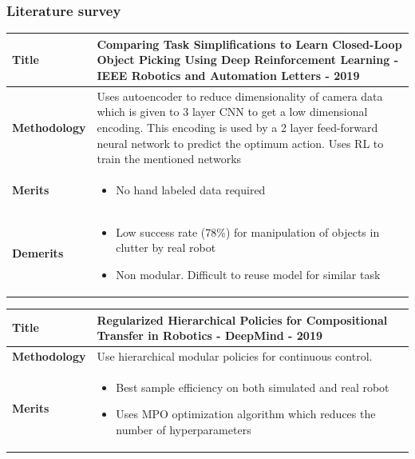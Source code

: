 \documentclass{beamer}
\begin{document}
	\begin{frame}[allowframebreaks]
		\frametitle{Literature survey}
	
		\begin{tabular}{m{2.25cm} | m{9cm}}
			\hline
			
			\textbf{Title} &
			Comparing Task Simplifications to Learn Closed-Loop Object Picking Using Deep Reinforcement Learning \cite{tasksimplification} - IEEE Robotics and Automation Letters - 2019\\
			\hline
			
			\textbf{Methodology} &
			Uses autoencoder to reduce dimensionality of camera data which is given to 3 layer CNN to get a low dimensional encoding. This encoding is used by a 2 layer feed-forward neural network to predict the optimum action. Uses RL to train the mentioned networks\\
			\hline
			
			\textbf{Merits} &
			\begin{itemize}
				\item No hand labeled data required
			\end{itemize} \\
			\hline
			
			\textbf{Demerits} &
			\begin{itemize}
				\item Low success rate (78\%) for manipulation of objects in clutter by real robot
				\item Non modular. Difficult to reuse model for similar task
			\end{itemize}\\
			\hline
			
		\end{tabular}
	
		\begin{tabular}{m{2.25cm} | m{9cm}}
			\hline
			
			\textbf{Title} &
			Regularized Hierarchical Policies for Compositional Transfer in Robotics \cite{rhpo} - DeepMind - 2019\\
			\hline
			
			\textbf{Methodology} &
			Use hierarchical modular policies for continuous control. \\
			\hline
			
			\textbf{Merits} &
			\begin{itemize}
				\item Best sample efficiency on both simulated and real robot
				\item Uses MPO optimization algorithm which reduces the number of hyperparameters
			\end{itemize} \\
			\hline
			

\end{tabular}
\end{frame}
\end{document}
